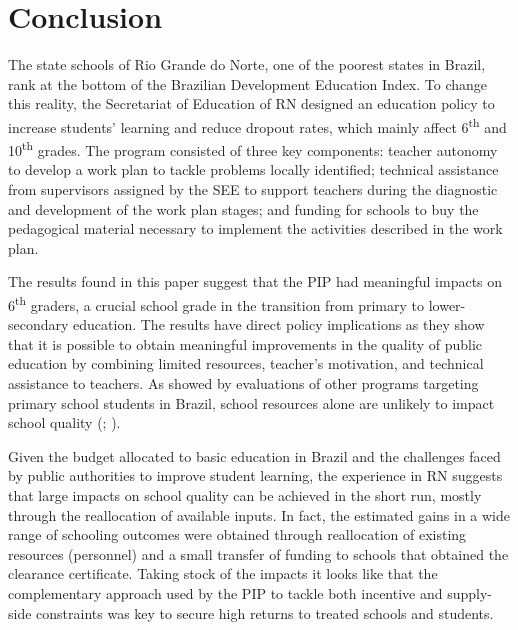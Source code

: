 \documentclass[11pt,a4paper]{article}
\begin{document}
\section{Conclusion} \label{sec:conclude}

The state schools of Rio Grande do Norte, one of the poorest states in Brazil, rank at the bottom of the Brazilian Development Education Index. To change this reality, the Secretariat of Education of RN designed an education policy to increase students' learning and reduce dropout rates, which mainly affect 6\textsuperscript{th} and 10\textsuperscript{th} grades. The program consisted of three key components: teacher autonomy to develop a work plan to tackle problems locally identified; technical assistance from supervisors assigned by the SEE to support teachers during the diagnostic and development of the work plan stages; and funding for schools to buy the pedagogical material necessary to implement the activities described in the work plan. 

The results found in this paper suggest that the PIP had meaningful impacts on 6\textsuperscript{th} graders, a crucial school grade in the transition from primary to lower-secondary education. The results have direct policy implications as they show that it is possible to obtain meaningful improvements in the quality of public education by combining limited resources, teacher's motivation, and technical assistance to teachers. As showed by evaluations of other programs targeting primary school students in Brazil, school resources alone are unlikely to impact school quality (\citealp{almeida2016assessing}; \citealp{de2016impacto}). 

Given the budget allocated to basic education in Brazil and the challenges faced by public authorities to improve student learning, the experience in RN suggests that large impacts on school quality can be achieved in the short run, mostly through the reallocation of available inputs. In fact, the estimated gains in a wide range of schooling outcomes were obtained through reallocation of existing resources (personnel) and a small transfer of funding to schools that obtained the clearance certificate. Taking stock of the impacts it looks like that the complementary approach used by the PIP to tackle both incentive and supply-side constraints was key to secure high returns to treated schools and students.



\end{document}

